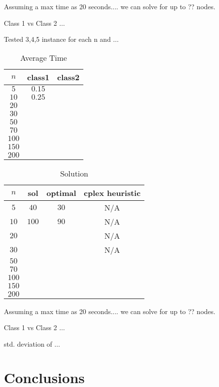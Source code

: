 \documentclass[a4paper, 11pt]{article}
\begin{document}
	Assuming a max time as 20 seconds.... we can solve for up to ?? nodes.
	
	Class 1 vs Class 2 $\ldots$
	
	Tested 3,4,5 instance for each n and $\ldots$
	\begin{table}[H]
		\centering
		\begin{tabular}{c|c|c}
			\textbf{$ n $} 	& \textbf{class1} & \textbf{class2}  \\ \hline
			$ 5  $			& $ 0.15 $ 			& $  $ \\ \hline
			$ 10  $			& $ 0.25 $ 			& $ $ \\ \hline
			$ 20  $			& $  $ 			& $  $ \\ \hline
			$ 30  $			& $  $	 		& $  $ \\ \hline
			$ 50  $			& $  $	 		& $  $ \\ \hline
			$ 70  $			& $  $	 		& $  $ \\ \hline
			$ 100 $			& $  $	 		& $  $ \\ \hline
			$ 150 $			& $  $	 		& $  $ \\ \hline
			$ 200 $			& $  $ 			& $  $ \\ 
		\end{tabular}
		\caption{Average Time}
		\label{table:times2}
	\end{table}

	\begin{table}[H]
		\centering
		\begin{tabular}{c|c|c|c}
			\textbf{$ n $} 	& \textbf{sol} & \textbf{optimal}   & \textbf{cplex heuristic}  \\ \hline
			$ 5  $			& $ 40 $ 		& $ 30 $ 			& N/A \\ \hline
			$ 10  $			& $ 100 $ 		& $ 90 $ 			& N/A \\ \hline
			$ 20  $			& $  $ 			& $  $ 				& N/A \\ \hline
			$ 30  $			& $  $	 		& $  $ 				& N/A \\ \hline
			$ 50  $			& $  $	 		& $  $ 				& $  $ \\ \hline
			$ 70  $			& $  $	 		& $  $ 				& $  $ \\ \hline
			$ 100 $			& $  $	 		& $  $ 				& $  $ \\ \hline
			$ 150 $			& $  $	 		& $  $ 				& $  $ \\ \hline
			$ 200 $			& $  $ 			& $  $ 				& $  $ \\
		\end{tabular}
		\caption{Solution}
		\label{table:sols}
	\end{table}
	
	Assuming a max time as 20 seconds.... we can solve for up to ?? nodes.
	
	Class 1 vs Class 2 $\ldots$
	
	std. deviation of $\ldots$
	
	
	\section{Conclusions}
	
	
\end{document}
